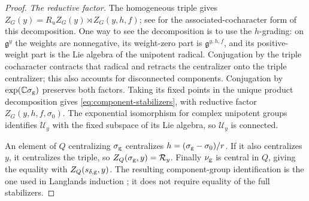\documentclass[11pt]{amsart}
\theoremstyle{definition}
\theoremstyle{remark}
\begin{document}
\begin{proof}
\emph{The reductive factor.}
The homogeneous triple gives
$Z_G(y)=R_uZ_G(y)\rtimes Z_G(y,h,f)$;
see \cite[(4.1.1)(b)--(d)]{McNinch} for the associated-cocharacter
form of this decomposition.
One way to see the decomposition is to use the $h$-grading: on
$\mathfrak g^y$ the weights are nonnegative, its weight-zero part is
$\mathfrak g^{y,h,f}$, and its positive-weight part is the Lie algebra
of the unipotent radical.  Conjugation by the triple cocharacter
contracts that radical and retracts the centralizer onto the
triple centralizer; this also accounts for disconnected components.
Conjugation by $\exp(\mathbb C\sigma_{\rm g})$ preserves both factors.
Taking its fixed points in the unique product decomposition gives
\eqref{eq:component-stabilizers}, with reductive factor
$Z_G(y,h,f,\sigma_0)$.  The exponential isomorphism for complex
unipotent groups identifies $\mathcal U_y$ with the fixed subspace
of its Lie algebra, so $\mathcal U_y$ is connected.

An element of $Q$ centralizing $\sigma_{\rm g}$ centralizes
$h=(\sigma_{\rm g}-\sigma_0)/r$.  If it also centralizes $y$, it
centralizes the triple, so $Z_Q(\sigma_{\rm g},y)=\mathcal R_y$.
Finally $\nu_{\rm g}$ is central in $Q$, giving the equality with
$Z_Q(s_{\delta,{\rm g}},y)$.  The resulting component-group
identification is the one used in Langlands induction
\cite[Theorem~B.2(c) and Proposition~B.4]{Solleveld}; it does not
require equality of the full stabilizers.


\end{proof}
\end{document}
